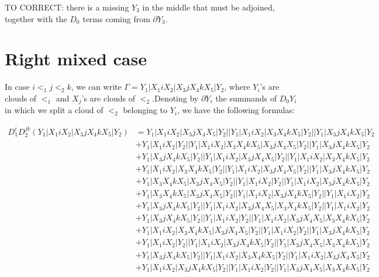 \documentclass{article}[12pt]
\begin{document}
TO CORRECT: there is a missing $Y_3$ in the middle that must be adjoined, together with the $D_0$ terms coming from $\partial Y_3$.
\section*{Right mixed case}
In case $i<_1 j <_2 k$, we can write  $\Gamma = Y_1|X_1 i X_2 | X_3 j X_4 k X_5 | Y_2$, where $Y_i$'s are clouds of $<_1$ and $X_j$'s are clouds of $<_2$.Denoting by $\partial Y_i$ the summands of $D_0 Y_i$ in which we split a cloud of $<_2$ belonging to $Y_i$, we have the following formulas:

\begin{align*}
D_1^iD_2^{jk}(Y_1|X_1iX_2|X_3jX_4kX_5|Y_2)& =Y_1|X_1iX_2|X_3jX_4X_5|Y_2||Y_1|X_1iX_2|X_3X_4kX_5|Y_2||Y_1|X_3jX_4kX_5|Y_2\\ 
 & +Y_1|X_1iX_2|Y_2||Y_1|X_1iX_2|X_3X_4kX_5|X_3jX_4X_5|Y_2||Y_1|X_3jX_4kX_5|Y_2\\ 
 & +Y_1|X_3jX_4kX_5|Y_2||Y_1|X_1iX_2|X_3jX_4X_5|Y_2||Y_1|X_1iX_2|X_3X_4kX_5|Y_2\\ 
 & +Y_1|X_1iX_2|X_3X_4kX_5|Y_2||Y_1|X_1iX_2|X_3jX_4X_5|Y_2||Y_1|X_3jX_4kX_5|Y_2\\ 
 & +Y_1|X_3X_4kX_5|X_3jX_4X_5|Y_2||Y_1|X_1iX_2|Y_2||Y_1|X_1iX_2|X_3jX_4kX_5|Y_2\\ 
 & +Y_1|X_3X_4kX_5|X_3jX_4X_5|Y_2||Y_1|X_1iX_2|X_3jX_4kX_5|Y_2||Y_1|X_1iX_2|Y_2\\ 
 & +Y_1|X_3jX_4kX_5|Y_2||Y_1|X_1iX_2|X_3jX_4X_5|X_3X_4kX_5|Y_2||Y_1|X_1iX_2|Y_2\\ 
 & +Y_1|X_3jX_4kX_5|Y_2||Y_1|X_1iX_2|Y_2||Y_1|X_1iX_2|X_3jX_4X_5|X_3X_4kX_5|Y_2\\ 
 & +Y_1|X_1iX_2|X_3X_4kX_5|X_3jX_4X_5|Y_2||Y_1|X_1iX_2|Y_2||Y_1|X_3jX_4kX_5|Y_2\\ 
 & +Y_1|X_1iX_2|Y_2||Y_1|X_1iX_2|X_3jX_4kX_5|Y_2||Y_1|X_3jX_4X_5|X_3X_4kX_5|Y_2\\ 
 & +Y_1|X_3jX_4kX_5|Y_2||Y_1|X_1iX_2|X_3X_4kX_5|Y_2||Y_1|X_1iX_2|X_3jX_4X_5|Y_2\\ 
 & +Y_1|X_1iX_2|X_3jX_4kX_5|Y_2||Y_1|X_1iX_2|Y_2||Y_1|X_3jX_4X_5|X_3X_4kX_5|Y_2\end{align*}
\end{document}

